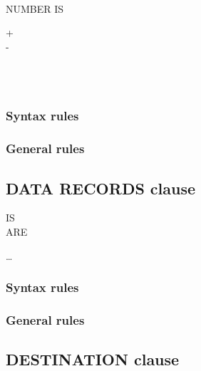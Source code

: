 \begin{syntax}
  \begin{1=}
     \\
  \end{1=}
  NUMBER IS
  \begin{0-1}
    + \\
    - \\
     \\
  \end{0-1}
  \begin{1=}
    \identifier \\
    \integer
  \end{1=}
\end{syntax}

\subsubsection{Syntax rules}

\subsubsection{General rules}

\subsection{DATA RECORDS clause}

\begin{syntax}[\deletedcolour]
  \begin{1=}
     IS \\
     ARE
  \end{1=}
  \begin{1=}
    \identifier
  \end{1=}\ldots
\end{syntax}

\subsubsection{Syntax rules}

\subsubsection{General rules}

\subsection{DESTINATION clause}

